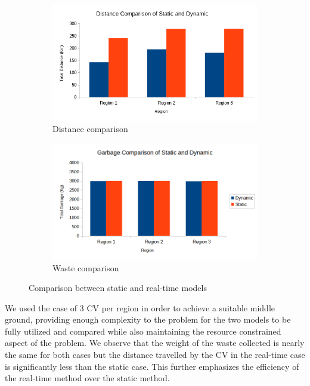 \documentclass[12pt]{article}
\begin{document}
\begin{figure}[H]
    \centering
    \begin{subfigure}{0.5\textwidth}
        \centering
        \includegraphics[width=\linewidth]{Total Distance Comparision of Static and Dynamic.png}
        \caption{Distance comparison}\label{figh1}
    \end{subfigure}%
    \begin{subfigure}{0.5\textwidth}
        \centering
        \includegraphics[width=\linewidth]{Total Garbage Comparision of Static and Dynamic.png}
        \caption{Waste comparison}\label{figh2}
    \end{subfigure}
    \caption{Comparison between static and real-time models}
    \label{figh}
\end{figure}

We used the case of 3 CV per region in order to achieve a suitable middle ground, providing enough complexity to the problem for the two models to be fully utilized and compared while also maintaining the resource constrained aspect of the problem. We observe that the weight of the waste collected is nearly the same for both cases but the distance travelled by the CV in the real-time case is significantly less than the static case. This further emphasizes the efficiency of the real-time method over the static method.
\end{document}
